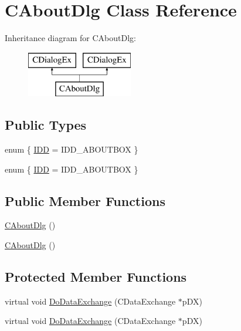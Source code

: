\hypertarget{class_c_about_dlg}{}\section{C\+About\+Dlg Class Reference}
\label{class_c_about_dlg}
Inheritance diagram for C\+About\+Dlg\+:\begin{figure}[H]
\begin{center}
\leavevmode
\includegraphics[height=2.000000cm]{class_c_about_dlg}
\end{center}
\end{figure}
\subsection*{Public Types}
\begin{DoxyCompactItemize}
\item 
enum \{ \hyperlink{class_c_about_dlg_a2bf6fe175354c5940fc5a7be4112b763a6770a5e86baf52bc825f7381a62f47eb}{I\+D\+D} = I\+D\+D\+\_\+\+A\+B\+O\+U\+T\+B\+O\+X
 \}
\item 
enum \{ \hyperlink{class_c_about_dlg_a2bf6fe175354c5940fc5a7be4112b763a6770a5e86baf52bc825f7381a62f47eb}{I\+D\+D} = I\+D\+D\+\_\+\+A\+B\+O\+U\+T\+B\+O\+X
 \}
\end{DoxyCompactItemize}
\subsection*{Public Member Functions}
\begin{DoxyCompactItemize}
\item 
\hyperlink{class_c_about_dlg_a6d1e6a33fef23bee6e75254189d865ce}{C\+About\+Dlg} ()
\item 
\hyperlink{class_c_about_dlg_a6d1e6a33fef23bee6e75254189d865ce}{C\+About\+Dlg} ()
\end{DoxyCompactItemize}
\subsection*{Protected Member Functions}
\begin{DoxyCompactItemize}
\item 
virtual void \hyperlink{class_c_about_dlg_ab83db7484fec957282d7d5a21aed4df4}{Do\+Data\+Exchange} (C\+Data\+Exchange $\ast$p\+D\+X)
\item 
virtual void \hyperlink{class_c_about_dlg_a18b361b8d48610a7fd345c6b078a2223}{Do\+Data\+Exchange} (C\+Data\+Exchange $\ast$p\+D\+X)
\end{DoxyCompactItemize}


